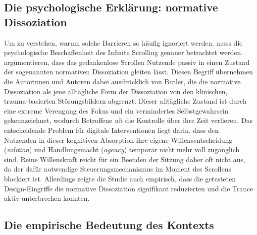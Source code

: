 \documentclass[11pt,a4paper]{article}
\begin{document}
\subsection{Die psychologische Erklärung: normative Dissoziation}

Um zu verstehen, warum solche Barrieren so häufig ignoriert werden, muss die psychologische
Beschaffenheit des Infinite Scrolling genauer betrachtet werden. \citet{baughan2022dissociation}
argumentieren, dass das gedankenlose Scrollen Nutzende passiv in einen Zustand der
sogenannten normativen Dissoziation gleiten lässt. Diesen Begriff übernehmen die Autorinnen
und Autoren dabei ausdrücklich von Butler, die die normative Dissoziation als jene
alltägliche Form der Dissoziation von den klinischen, trauma-basierten Störungsbildern
abgrenzt. Dieser alltägliche Zustand ist durch eine
extreme Verengung des Fokus und ein vermindertes Selbstgewahrsein gekennzeichnet, wodurch
Betroffene oft die Kontrolle über ihre Zeit verlieren. Das entscheidende Problem für
digitale Interventionen liegt darin, dass den Nutzenden in dieser kognitiven Absorption ihre
eigene Willensentscheidung (\emph{volition}) und Handlungsmacht (\emph{agency}) temporär
nicht mehr voll zugänglich sind. Reine Willenskraft reicht für ein Beenden der Sitzung daher
oft nicht aus, da der dafür notwendige Steuerungsmechanismus im Moment des Scrollens
blockiert ist. Allerdings zeigte die Studie auch empirisch, dass die getesteten
Design-Eingriffe die normative Dissoziation signifikant reduzierten und die Trance aktiv
unterbrechen konnten.

\subsection{Die empirische Bedeutung des Kontexts}
\end{document}
